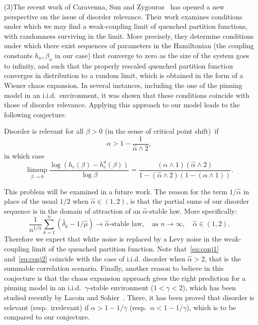 \documentclass[10pt]{amsart}
\theoremstyle{definition}\newtheorem{defi}[theo]{Definition}\newtheorem{rema}[theo]{Remark}\newtheorem{exam}[theo]{Example}\newtheorem{exem}[theo]{Example}\newtheorem{nota}[theo]{Notation}
\newcommand{\ga}{\alpha}
\newcommand{\gb}{\beta}
\newcommand{\gd}{\delta}
\newcommand{\ha}{\hat\ga}
\newcommand{\hmu}{\hat \mu}
\begin{document}
\medskip
\noindent (3)\enskip The recent work of Caravenna, Sun and Zygouras~\cite{CSZ16+} has opened a new perspective on the issue of disorder relevance. Their work examines conditions under which we may find a weak-coupling limit of quenched partition functions, with randomness surviving in the limit. More precisely, they determine conditions under which there exist sequences of parameters in the Hamiltonian (the coupling constants $h_n, \gb_n$ in our case) that converge to zero as the size of the system goes to infinity, and such that the properly rescaled quenched partition function converges in distribution to a random limit, which is obtained in the form of a Wiener chaos expansion. In several instances, including the one of the pinning model in an i.i.d.~environment, it was shown that these conditions coincide with those of disorder relevance. Applying this approach to our model leads to the following conjecture.

\begin{conj}\label{ConjRelevance}
Disorder is relevant for all $\gb>0$ (in the sense of critical point shift)~if
\begin{equation}\label{eq:conj1}
\ga > 1 - \frac{1}{\ha \wedge 2},
\end{equation}
in which case
\begin{equation} \label{eq:conj2}
\limsup_{\gb \to 0} \frac{\log (h_c(\gb) - h_c^a(\gb))}{\log \gb} = \frac{(\ga\wedge 1)(\ha\wedge 2)}{1-(\ha\wedge 2)(1-(\ga\wedge 1))}.
\end{equation}
\end{conj}

This problem will be examined in a future work. The reason for the term $1/\ha$ in place of the usual $1/2$ when $\ha\in (1,2)$, is that the partial sums of our disorder sequence is in the domain of attraction of an $\ha$-stable law. More specifically:
\begin{equation}
\frac{1}{n^{1/\ha}} \sum_{k=1}^n (\hat \gd_k - 1/\hmu) \longrightarrow \ha\text{-stable law},\quad \text{as\ } n\to\infty,\quad \ha\in(1,2).
\end{equation}
Therefore we expect that white noise is replaced by a Levy noise in the weak-coupling limit of the quenched partition function. Note that~\eqref{eq:conj1} and~\eqref{eq:conj2} coincide with the case of i.i.d. disorder when $\ha>2$, that is the summable correlation scenario. Finally, another reason to believe in this conjecture is that the chaos expansion approach gives the right prediction for a pinning model in an i.i.d.~$\gamma$-stable environment ($1 < \gamma < 2$), which has been studied recently by Lacoin and Sohier~\cite{LS16+}. There, it has been proved that disorder is relevant (resp.~irrelevant) if $\ga > 1 - 1/\gamma$ (resp.~$\ga < 1 - 1/\gamma$), which is to be compared to our conjecture.
\end{document}
